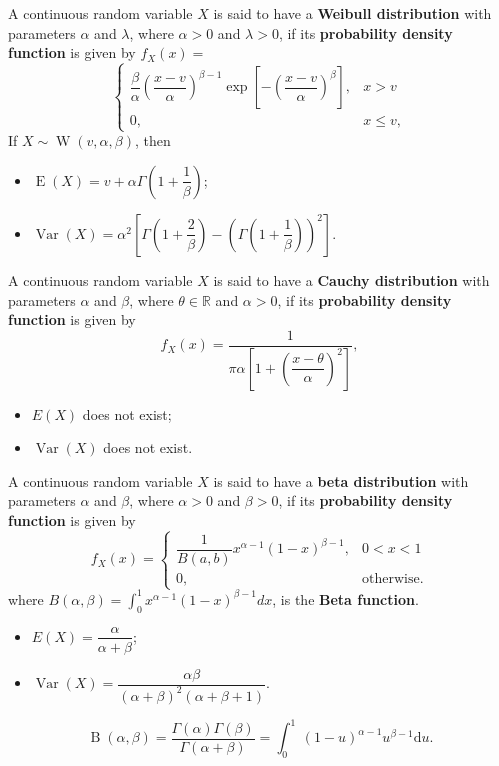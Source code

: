  A continuous random variable \(X\) is said to have a
\textbf{Weibull distribution} with parameters \(\alpha\) and \(\lambda\), where
\(\alpha > 0\) and \(\lambda > 0\), if its \textbf{probability density function}
is given by \(f_X(x) =\)
\[\begin{cases}
  \dfrac{\beta}{\alpha}\left(\dfrac{x-v}{\alpha}\right)^{\beta -
    1}\operatorname{exp}\left[-\left(\dfrac{x-v}{\alpha}\right)^\beta \right],
    & x > v \\
  0, & x \leq v,
\end{cases}\]
If \(X \sim \operatorname{W}\left(v,\alpha,\beta\right)\), then 
\begin{itemize}
  \item \(\operatorname{E}(X) = v + \alpha\Gamma\left(1 + \dfrac{1}{\beta}\right)\);
  \item \(\operatorname{Var}(X) = \alpha^2\left[\Gamma\left(1 + \dfrac{2}{\beta}\right) -
    \left(\Gamma\left(1 + \dfrac{1}{\beta}\right)\right)^2\right]\).
\end{itemize}

 A continuous random variable \(X\) is said to have a
\textbf{Cauchy distribution} with parameters \(\alpha\) and \(\beta\), where
\(\theta \in \mathbb{R}\) and \(\alpha > 0\), if its \textbf{probability density
function} is given by
\[f_X(x) = \dfrac{1}{\pi\alpha\left[1 + \left(\dfrac{x-\theta}{\alpha}\right)^2\right]},\]
\begin{itemize}
  \item \(E(X)\) does not exist;
  \item \(\operatorname{Var}(X)\) does not exist.
\end{itemize}

 A continuous random variable \(X\) is said to have a
\textbf{beta distribution} with parameters \(\alpha\) and \(\beta\), where
\(\alpha > 0\) and \(\beta > 0\), if its \textbf{probability density function}
is given by
\[f_X(x) = \begin{cases}
  \dfrac{1}{B(a,b)}x^{\alpha-1}(1-x)^{\beta-1},
  & 0 < x < 1 \\
  0, & \text{otherwise}.
\end{cases}\]
where \(B(\alpha, \beta) = \int_0^1 x^{\alpha-1}(1-x)^{\beta-1}dx\), is the 
\textbf{Beta function}. 
\begin{itemize}
  \item \(E(X) = \dfrac{\alpha}{\alpha + \beta}\);
  \item \(\operatorname{Var}(X) = \dfrac{\alpha\beta}{(\alpha + \beta)^2(\alpha +
    \beta + 1)}\).
\end{itemize}
 \[\operatorname{B}\left(\alpha,\beta\right) =
\dfrac{\Gamma(\alpha)\Gamma(\beta)}{\Gamma(\alpha + \beta)} = \int_{0}^{1}\
(1-u)^{\alpha-1}u^{\beta - 1}\mathrm{d}u.\]

